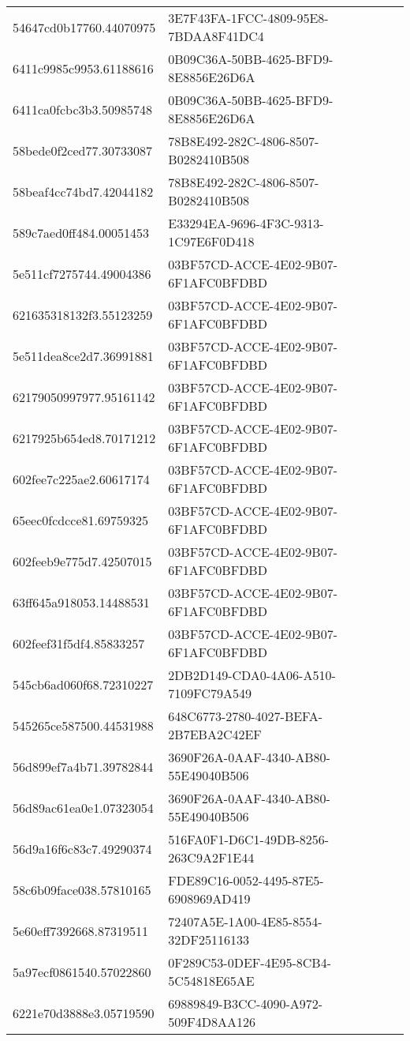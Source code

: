 \begin{tabular}{ll}
54647cd0b17760.44070975 & 3E7F43FA-1FCC-4809-95E8-7BDAA8F41DC4 \\
6411c9985c9953.61188616 & 0B09C36A-50BB-4625-BFD9-8E8856E26D6A \\
6411ca0fcbc3b3.50985748 & 0B09C36A-50BB-4625-BFD9-8E8856E26D6A \\
58bede0f2ced77.30733087 & 78B8E492-282C-4806-8507-B0282410B508 \\
58beaf4cc74bd7.42044182 & 78B8E492-282C-4806-8507-B0282410B508 \\
589c7aed0ff484.00051453 & E33294EA-9696-4F3C-9313-1C97E6F0D418 \\
5e511cf7275744.49004386 & 03BF57CD-ACCE-4E02-9B07-6F1AFC0BFDBD \\
621635318132f3.55123259 & 03BF57CD-ACCE-4E02-9B07-6F1AFC0BFDBD \\
5e511dea8ce2d7.36991881 & 03BF57CD-ACCE-4E02-9B07-6F1AFC0BFDBD \\
62179050997977.95161142 & 03BF57CD-ACCE-4E02-9B07-6F1AFC0BFDBD \\
6217925b654ed8.70171212 & 03BF57CD-ACCE-4E02-9B07-6F1AFC0BFDBD \\
602fee7c225ae2.60617174 & 03BF57CD-ACCE-4E02-9B07-6F1AFC0BFDBD \\
65eec0fcdcce81.69759325 & 03BF57CD-ACCE-4E02-9B07-6F1AFC0BFDBD \\
602feeb9e775d7.42507015 & 03BF57CD-ACCE-4E02-9B07-6F1AFC0BFDBD \\
63ff645a918053.14488531 & 03BF57CD-ACCE-4E02-9B07-6F1AFC0BFDBD \\
602feef31f5df4.85833257 & 03BF57CD-ACCE-4E02-9B07-6F1AFC0BFDBD \\
545cb6ad060f68.72310227 & 2DB2D149-CDA0-4A06-A510-7109FC79A549 \\
545265ce587500.44531988 & 648C6773-2780-4027-BEFA-2B7EBA2C42EF \\
56d899ef7a4b71.39782844 & 3690F26A-0AAF-4340-AB80-55E49040B506 \\
56d89ac61ea0e1.07323054 & 3690F26A-0AAF-4340-AB80-55E49040B506 \\
56d9a16f6c83c7.49290374 & 516FA0F1-D6C1-49DB-8256-263C9A2F1E44 \\
58c6b09face038.57810165 & FDE89C16-0052-4495-87E5-6908969AD419 \\
5e60eff7392668.87319511 & 72407A5E-1A00-4E85-8554-32DF25116133 \\
5a97ecf0861540.57022860 & 0F289C53-0DEF-4E95-8CB4-5C54818E65AE \\
6221e70d3888e3.05719590 & 69889849-B3CC-4090-A972-509F4D8AA126 \\

\end{tabular}
